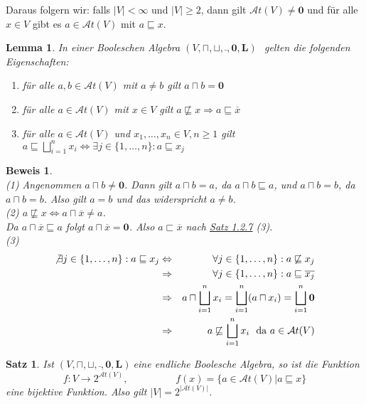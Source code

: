 \documentclass[ngerman]{scrartcl}
\theoremstyle{custom}
\newtheorem{ms}[mdef]{Satz}
\newtheorem{ml}[mdef]{Lemma}
\newtheorem*{bw}{Beweis}
\newcommand{\0}{\mathbf{0}}
\newcommand{\1}{\mathbf{L}}
\newcommand{\at}{\mathcal{A}t}
\newcommand{\ba}{$(V, \sqcap, \sqcup, \bar~, \0, \1)~$}
\begin{document}
Daraus folgern wir: falls $\vert V \vert < \infty$ und $\vert V \vert
\geq 2$, dann gilt $\at(V) \not= \0$ und f\"ur alle $x \in V$ gibt es
$a \in \at(V)$ mit $a \sqsubseteq x$.

\begin{ml}
In einer Booleschen Algebra \ba ~gelten die folgenden Eigenschaften:
\begin{enumerate}
\item f\"ur alle $a, b \in \at(V)$ mit $a \not= b$ gilt $a \sqcap b =
  \0$
\item f\"ur alle $a \in \at(V)$ mit $x \in V$ gilt $a \not \sqsubseteq
  x \Rightarrow a \sqsubseteq \overline{x}$
\item f\"ur alle $a \in \at(V)$ und $x_1, \dots, x_n \in V, n \geq 1$
  gilt $a \sqsubseteq \bigsqcup_{i=1}^{n} x_i \Leftrightarrow \exists
  j \in \{1, \dots, n\}: a \sqsubseteq x_j$
\end{enumerate}
\end{ml}

\begin{bw} ~\\
(1) Angenommen $a \sqcap b \not= \0$. Dann gilt $a \sqcap b = a$, da
$a \sqcap b \sqsubseteq a$, und $a \sqcap b = b$, da $a \sqcap b =
b$. Also gilt $a=b$ und das widerspricht $a \not= b$.\\
(2) $a \not \sqsubseteq x \Leftrightarrow a \sqcap \overline{x} \not =
a$.\\ Da $a \sqcap \overline{x} \sqsubseteq a$ folgt $a \sqcap
\overline{x} = \0$. Also $a \sqsubset \overline{x}$ nach \hyperref[s127]{Satz 1.2.7}
(3).\\
(3)
\begin{eqnarray*}
\not \exists j \in \{1, \dots, n\}: a \sqsubseteq x_j &\Leftrightarrow&
\forall j \in \{1, \dots, n\}: a \not \sqsubseteq x_j \\
&\Rightarrow& \forall j \in \{1, \dots, n\}: a \sqsubseteq
\overline{x_j} \\
&\Rightarrow& a \sqcap \bigsqcup_{i=1}^{n} x_i = \bigsqcup_{i=1}^{n}
(a \sqcap x_i) = \bigsqcup_{i=1}^{n} \0 \\
&\Rightarrow& a \not \sqsubseteq \bigsqcup_{i=1}^{n} x_i ~\text{ da }a
  \in \at(V)
\end{eqnarray*}
\end{bw}

\begin{ms}
Ist \ba eine endliche Boolesche Algebra, so ist die Funktion
\begin{equation*}
f: V \rightarrow 2^{\at(V)}, \hspace{2cm} f(x) = \lbrace a \in \at(V) \vert a \sqsubseteq
  x\rbrace
\end{equation*}
eine bijektive Funktion. Also gilt $\vert V \vert = 2^{\vert
    \at(V) \vert}$.
\end{ms}
\end{document}
